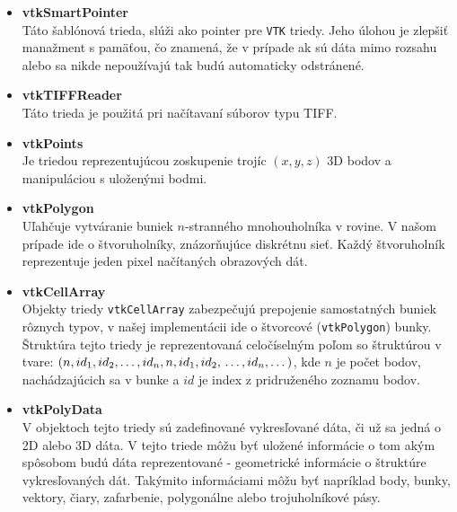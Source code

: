 \documentclass[a4paper,11pt,oneside]{article}%
\begin{document}
\begin{itemize}
\item \textbf{vtkSmartPointer} \\
Táto šablónová trieda, slúži ako pointer pre \texttt{VTK} triedy. Jeho úlohou je zlepšiť manažment s pamäťou, čo znamená, že v prípade ak sú dáta mimo rozsahu alebo sa nikde nepoužívajú tak budú automaticky odstránené. %

\item \textbf{vtkTIFFReader} \\
Táto trieda je použitá pri načítavaní súborov typu TIFF.

\item \textbf{vtkPoints} \\
Je triedou reprezentujúcou zoskupenie trojíc $(x, y, z)$ 3D bodov a manipuláciou s uloženými bodmi.
 
\item \textbf{vtkPolygon} \\
Uľahčuje vytváranie buniek $n$-stranného mnohouholníka v rovine. V našom prípade ide o štvoruholníky, znázorňujúce diskrétnu sieť. Každý štvoruholník reprezentuje jeden pixel načítaných obrazových dát.     
 

\item \textbf{vtkCellArray} \\
Objekty triedy \texttt{vtkCellArray} zabezpečujú prepojenie samostatných buniek rôznych typov, v našej implementácii ide o štvorcové (\texttt{vtkPolygon}) bunky. Štruktúra tejto triedy je reprezentovaná celočíselným poľom so štruktúrou v tvare: $(n,id_1,id_2, \dots,id_n, n,id_1,id_2, \\ \dots,id_n, \dots)$, kde $n$ je počet bodov, nachádzajúcich sa v bunke a $id$ je index z pridruženého zoznamu bodov.

\item \textbf{vtkPolyData} \\
V objektoch tejto triedy sú zadefinované vykresľované dáta, či už sa jedná o 2D alebo 3D dáta. V tejto triede môžu byť uložené informácie o tom akým spôsobom budú dáta reprezentované - geometrické informácie o štruktúre vykresľovaných dát. Takýmito informáciami môžu byť napríklad body, bunky, vektory, čiary, zafarbenie, polygonálne alebo trojuholníkové pásy.


\end{itemize}
\end{document}
